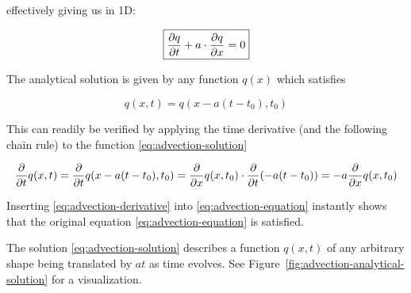 effectively giving us in 1D:

\begin{equation}
\boxed{
	\frac{\partial  q }{\partial t} + a \cdot \frac{\partial q}{\partial x} = 0 \label{eq:advection-equation}
}
\end{equation}

The analytical solution is given by any function $q(x)$ which satisfies

\begin{equation}
	q(x, t) = q(x - a (t - t_0), t_0) \label{eq:advection-solution}
\end{equation}

This can readily be verified by applying the time derivative (and the following
chain rule) to the function \ref{eq:advection-solution}

\begin{align}
	\frac{\partial}{\partial t} q(x, t) = \frac{\partial}{\partial t} q(x - a(t - t_0), t_0)
		= \frac{\partial}{\partial x}{q(x, t_0)} \cdot  \frac{\partial}{\partial t}{\left( - a(t - t_0) \right)}
		= - a \frac{\partial}{\partial x}{q(x, t_0)} \label{eq:advection-derivative}
\end{align}

Inserting \ref{eq:advection-derivative} into \ref{eq:advection-equation}
instantly shows that the original equation \ref{eq:advection-equation} is satisfied.

The solution \ref{eq:advection-solution} describes a function $q(x, t)$ of any
arbitrary shape being translated by $a t$ as time evolves. See
Figure~\ref{fig:advection-analytical-solution} for a visualization.


